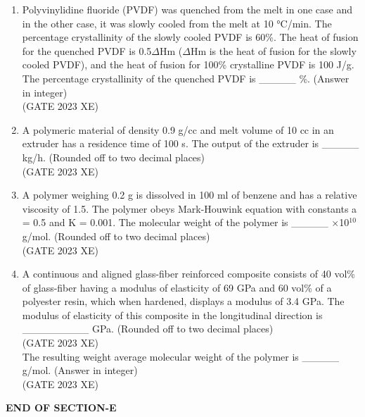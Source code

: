 \documentclass[journal,12pt,onecolumn]{IEEEtran}
\begin{document}
\begin{enumerate}
\item Polyvinylidine fluoride (PVDF) was quenched from the melt in one case and in the other case, it was slowly cooled from the melt at 10 °C/min. The percentage crystallinity of the slowly cooled PVDF is 60\%. The heat of fusion for the quenched PVDF is 0.5$\Delta$Hm ($\Delta$Hm is the heat of fusion for the slowly cooled PVDF), and the heat of fusion for 100\% crystalline PVDF is 100 J/g. The percentage crystallinity of the quenched PVDF is \_\_\_\_\_ \%. (Answer in integer)\\
\hfill{(GATE 2023 XE)}\\

\item A polymeric material of density 0.9 g/cc and melt volume of 10 cc in an extruder has a residence time of 100 s. The output of the extruder is \_\_\_\_\_ kg/h. (Rounded off to two decimal places)\\
\hfill{(GATE 2023 XE)}\\

\item A polymer weighing 0.2 g is dissolved in 100 ml of benzene and has a relative viscosity of 1.5. The polymer obeys Mark-Houwink equation with constants a = 0.5 and K = 0.001. The molecular weight of the polymer is \_\_\_\_\_ ×10$^{10}$ g/mol. (Rounded off to two decimal places)\\
\hfill{(GATE 2023 XE)}\\

\item A continuous and aligned glass-fiber reinforced composite consists of 40 vol\% of glass-fiber having a modulus of elasticity of 69 GPa and 60 vol\% of a polyester resin, which when hardened, displays a modulus of 3.4 GPa. The modulus of elasticity of this composite in the longitudinal direction is \_\_\_\_\_\_\_\_\_ GPa.
(Rounded off to two decimal places)\\
\hfill{(GATE 2023 XE)}\\


The resulting weight average molecular weight of the polymer is \_\_\_\_\_ g/mol. (Answer in integer)\\
\hfill{(GATE 2023 XE)}

\end{enumerate}


\begin{center}

\item[\textbf{END OF SECTION-E}]

\end{center}
\end{document}

